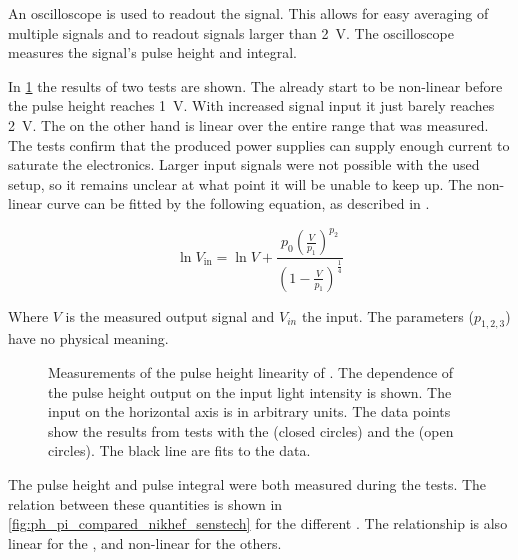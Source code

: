 An oscilloscope is used to readout the \pmt signal. This allows for easy averaging of multiple signals and to readout signals larger than \SI{2}{\volt}. The oscilloscope measures the signal's pulse height and integral.

In \cref{fig:linearity_pmts} the results of two \pmt tests are shown. The \senstech \pmt already start to be non-linear before the pulse height reaches \SI{1}{\volt}. With increased signal input it just barely reaches \SI{2}{\volt}. The \nikhef \pmt on the other hand is linear over the entire range that was measured. The tests confirm that the \nikhef produced \pmt power supplies can supply enough current to saturate the \hisparc electronics. Larger input signals were not possible with the used setup, so it remains unclear at what point it will be unable to keep up. The non-linear curve can be fitted by the following equation, as described in \cite{icecube2010pmt}.

\begin{equation}
    \ln V_{\mathrm{in}} = \ln V +
                          \frac{p_0 \left(\frac{V}{p_1}\right)^{p_2}}
                               {\left(1 - \frac{V}{p_1}\right)^{\frac{1}{4}}}
\end{equation}

Where $V$ is the measured output signal and $V_{in}$ the input. The parameters ($p_{1,2,3}$) have no physical meaning.

\begin{figure}
    \centering
    
    \caption{Measurements of the pulse height linearity of \pmts. The dependence of the pulse height output on the input light intensity is shown. The input on the horizontal axis is in arbitrary units. The data points show the results from tests with the \senstech \pmt (closed circles) and the \nikhef \pmt (open circles). The black line are fits to the data.}
    \label{fig:linearity_pmts}
\end{figure}

The pulse height and pulse integral were both measured during the tests. The relation between these quantities is shown in \cref{fig:ph_pi_compared_nikhef_senstech} for the different \pmts. The relationship is also linear for the \nikhef \pmt, and non-linear for the others.

